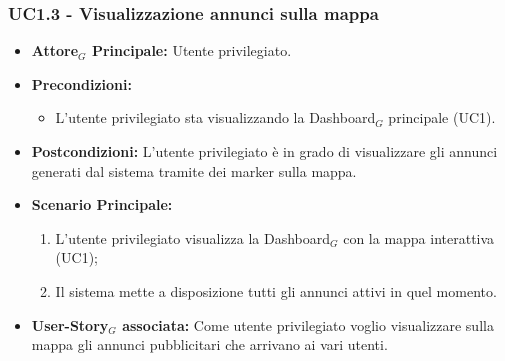 \documentclass[11pt]{article}
\begin{document}
\begin{justify}
\subsubsection{\textbf{UC1.3 - Visualizzazione annunci sulla mappa}}
\label{UC1.3}
\begin{itemize}
    \item \textbf{Attore$_G$ Principale:} Utente privilegiato.
    \item \textbf{Precondizioni:} 
        \begin{itemize}
    	\item L'utente privilegiato sta visualizzando la Dashboard$_G$ principale (UC1).
        \end{itemize}
     \item \textbf{Postcondizioni:} L'utente privilegiato è in grado di visualizzare gli annunci generati dal sistema tramite dei marker sulla mappa.
    \item \textbf{Scenario Principale:} 
      \begin{enumerate}
      \item L'utente privilegiato visualizza la Dashboard$_G$ con la mappa interattiva (UC1);
            \item Il sistema mette a disposizione tutti gli annunci attivi in quel momento.
	\end{enumerate}
    \item \textbf{User-Story$_G$ associata:} Come utente privilegiato voglio visualizzare sulla mappa gli annunci pubblicitari che arrivano ai vari utenti.
\end{itemize}

\end{justify}
\end{document}
